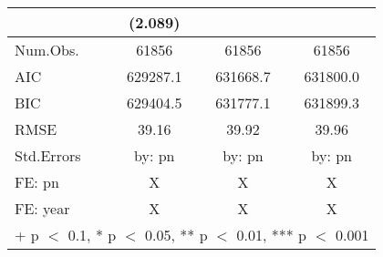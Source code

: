 \begin{table}
\begin{tabular}[t]{lccc}
 & (\num{2.089}) &  & \\
\midrule
Num.Obs. & \num{61856} & \num{61856} & \num{61856}\\
AIC & \num{629287.1} & \num{631668.7} & \num{631800.0}\\
BIC & \num{629404.5} & \num{631777.1} & \num{631899.3}\\
RMSE & \num{39.16} & \num{39.92} & \num{39.96}\\
Std.Errors & by: pn & by: pn & by: pn\\
FE: pn & X & X & X\\
FE: year & X & X & X\\
\bottomrule
\multicolumn{4}{l}{\rule{0pt}{1em}+ p $<$ 0.1, * p $<$ 0.05, ** p $<$ 0.01, *** p $<$ 0.001}\\
\end{tabular}
\end{table}
